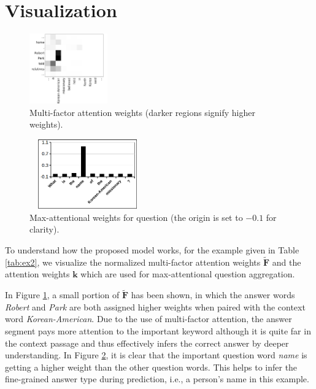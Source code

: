 \documentclass[letterpaper]{article} %
\begin{document}
\section{Visualization}
\label{sec:visualization}
\begin{figure}[t]
\centering
\includegraphics[width=0.3\textwidth]{short_mfa.png}
\caption{Multi-factor attention weights (darker regions signify higher weights).}
\label{fig:ex_mfa}
\end{figure}
\begin{figure}[t]
\centering
\includegraphics[width=5cm,height=3cm]{qma.png}
\caption{Max-attentional weights for question (the origin is set to $-0.1$ for clarity).}
\label{fig:ex_qma}
\end{figure}
To understand how the proposed model works, for the example given in Table \ref{tab:ex2}, we visualize the normalized multi-factor attention weights $\mathbf{\tilde{F}}$ and the attention weights $\mathbf{k}$ which are used for max-attentional question aggregation.

In Figure \ref{fig:ex_mfa}, a small portion of $\mathbf{\tilde{F}}$ has been shown, in which the answer words {\em Robert} and {\em Park} are both assigned higher weights when paired with the context word  {\em Korean-American}. Due to the use of multi-factor attention, the answer segment pays more attention to the important keyword although it is quite far in the context passage and thus effectively infers the correct answer by deeper understanding.
In Figure \ref{fig:ex_qma}, it is clear that the important question word {\em name} is getting a higher weight than the other question words. This helps to infer the fine-grained answer type during prediction, i.e., a person's name in this example.
\end{document}
